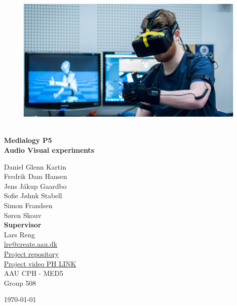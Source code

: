 \begin{titlepage}
			
\addtolength{\voffset}{2cm}

\begin{figure}[H]
\centering
\vspace{2cm}	%
\includegraphics[width=0.99\linewidth]{figure/Frontpage/frontpage.jpg}
\end{figure}

\mbox{}
\vfill
\renewcommand{\familydefault}{\sfdefault} \normalfont %
\HRule\\[0.1cm]
\textbf{{\small Medialogy P5\\ {\Huge Audio Visual experiments}}} \hspace{0.15cm}\\
\HRule\smallskip{}
\begin{multicols}{2}
{\Large Daniel Glenn Kartin\\Fredrik Dam Hansen\\Jens Jákup Gaardbo\\Sofie Jøhnk Stabell\\Simon Frandsen\\Søren Skouv\columnbreak}\\
\setlength{\parskip}{2.4cm}
{\Large{\textbf{Supervisor}\\Lars Reng\\\href{mailto:lre@create.aau.dk}{\color{blue}lre@create.aau.dk}}}\medskip\\
\href{https://github.com/jj-gaardbo/medialogyp5code}{\color{blue}Project repository}\\
\href{https://youtu.be/lOfH0zwrcAU}{\color{blue}Project video PH LINK}\medskip
\\\small AAU CPH - 
MED5 \\
Group 508\\
\end{multicols}
\today
\renewcommand{\familydefault}{\rmdefault} \normalfont %
\end{titlepage}


